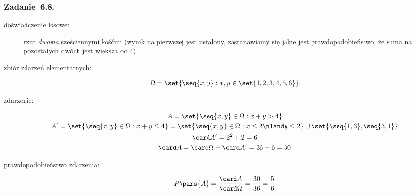 \subsubsection*{Zadanie~6.8.}
\begin{description}
    \item[doświadczenie losowe:] rzut \emph{dwoma} sześciennymi kośćmi (wynik na pierwszej jest ustalony, zastanawiamy się jakie jest prawdopodobieństwo, że suma na pozostałych dwóch jest większa od \(4\))
    \item[zbiór zdarzeń elementarnych:]
        \begin{gather*}
            \Omega = \set{\seq{x, y} : x, y \in \set{1, 2, 3, 4, 5, 6}}
        \end{gather*}
    \item[zdarzenie:]
        \begin{gather*}
            A = \set{\seq{x, y} \in \Omega : x + y > 4}\\
            A' = \set{\seq{x, y} \in \Omega : x + y \leq 4}
                = \set{\seq{x, y} \in \Omega : x \leq 2 \nland y \leq 2} \cup \set{\seq{1, 3}, \seq{3, 1}}\\
            \card A' = 2^2 + 2 = 6\\
            \card A = \card\Omega - \card A'
                = 36 - 6
                = 30
        \end{gather*}
    \item[prawdopodobieństwo zdarzenia:]
        \begin{equation*}
            P\pars{A}
                = \frac{\card A}{\card\Omega}
                = \frac{30}{36}
                = \frac{5}{6}
        \end{equation*}
\end{description}
